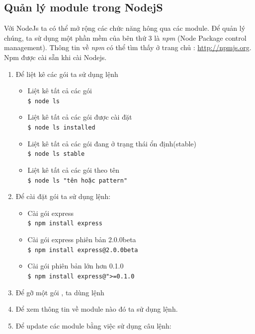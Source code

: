 	\subsection{Quản lý module trong NodejS}
		Với NodeJs ta có thể mở rộng các chức năng hông qua các module. Để quản lý chúng, ta sử dụng một phần mềm của bên thứ 3 là \textit{npm} (Node Package control management). Thông tin về \textit{npm} có thể tìm thấy ở trang chủ :  \url{http://npmjs.org}.
	 Npm được cài sẵn khi cài Nodejs.
	\begin{enumerate}
		
			\item Để liệt kê các gói ta sử dụng lệnh \\
				\begin{itemize}
					\item Liệt kê tất cả các gói \\
						\texttt{\$ node ls}
					\item Liệt kê tất cả các gói được cài đặt \\
						\texttt{\$ node ls installed}					
					\item Liệt kê tất cả các gói đang ở trạng thái ổn định(stable)\\
						\texttt{\$ node ls stable}						
					\item Liệt kê tất cả các gói theo tên \\
						\texttt{\$ node ls "tên hoặc pattern"}
				\end{itemize}
			
			\item Để cài đặt gói ta sử dụng lệnh:\\
				\begin{itemize}
					\item Cài gói express \\
						\texttt{\$ npm install express}
					\item Cài gói express phiên bản 2.0.0beta \\
						\texttt{\$ npm install  express@2.0.0beta}						
					\item Cài gói phiên bản lớn hơn 0.1.0 \\
						\texttt{\$ npm install express@">=0.1.0}
				\end{itemize}
			\item Để gỡ một gói , ta dùng lệnh \\
			\item Để xem thông tin về module nào đó ta sử dụng lệnh. \\
			\item Để update các module bằng việc sử dụng câu lệnh:\\
		\end{enumerate}
